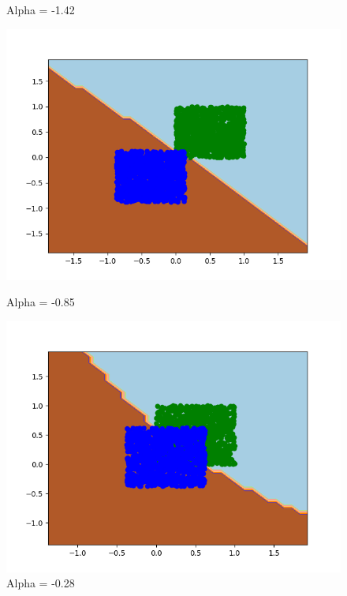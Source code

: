 \documentclass{article}
\begin{document}
\begin{figure}[!htb]
\begin{minipage}{0.24\textwidth}
			\caption{Alpha = -1.42}
	\end{minipage}
	\begin{minipage}{0.24\textwidth}
		\centering
		\includegraphics[width=1\linewidth]{../equalpriors/this9.png}
		\caption{Alpha = -0.85}
	\end{minipage}
	\begin{minipage}{0.24\textwidth}
		\centering
		\includegraphics[width=1\linewidth]{../equalpriors/this13.png}
		\caption{Alpha = -0.28}
	\end{minipage}
	\begin{minipage}{0.24\textwidth}
		\centering

\end{minipage}
\end{figure}
\end{document}
